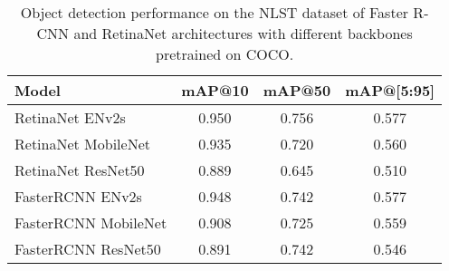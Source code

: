 \begin{table}[h]
    \centering
    \begin{tabular}{lccc}
        \hline
        \textbf{Model} & \textbf{mAP@10} & \textbf{mAP@50} & \textbf{mAP@[5:95]} \\
        \hline
        RetinaNet ENv2s      & 0.950 & 0.756 & 0.577 \\
        RetinaNet MobileNet  & 0.935 & 0.720 & 0.560  \\
        RetinaNet ResNet50   & 0.889 & 0.645 & 0.510  \\
        FasterRCNN ENv2s     & 0.948 & 0.742 & 0.577  \\
        FasterRCNN MobileNet & 0.908 & 0.725 & 0.559  \\
        FasterRCNN ResNet50  & 0.891 & 0.742 & 0.546  \\
        \hline
    \end{tabular}
    \caption{Object detection performance on the NLST dataset of Faster R-CNN and RetinaNet architectures with different backbones pretrained on COCO.}
    \label{tab:nlst-models}
\end{table}